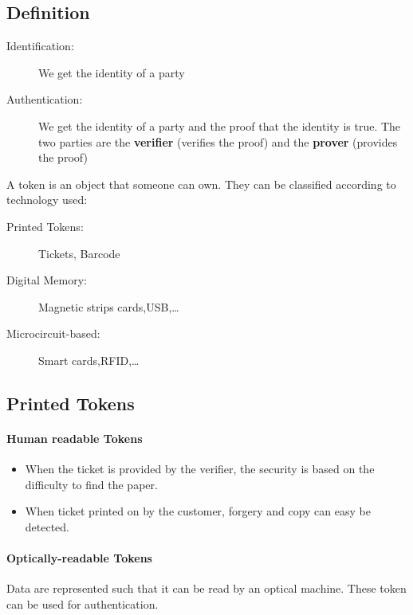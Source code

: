 \subsection{Definition}

\begin{description}
	\item[Identification:] We get the identity of a party
	\item[Authentication:] We get the identity of a party and the proof that the
	identity is true. The two parties are the \textbf{verifier}
    (verifies the proof) and the \textbf{prover} (provides the proof)
\end{description}

A token is an object that someone can own. They can be classified according to
technology used:

\begin{description}
	\item[Printed Tokens:] Tickets, Barcode
	\item[Digital Memory:] Magnetic strips cards,USB,\ldots
	\item[Microcircuit-based:] Smart cards,RFID,\ldots
\end{description}

\subsection{Printed Tokens}

    \paragraph{Human readable Tokens}
    \label{par:humanreadableTokens}

    \begin{itemize}
            \item When the ticket is provided by the verifier,
            the security is based on the difficulty to find the paper.
            \item When ticket printed on by the customer, forgery and
            copy can easy be detected.
    \end{itemize}

    \paragraph{Optically-readable Tokens}

    Data are represented such that it can be read by an optical
    machine. These token can be used for authentication.

